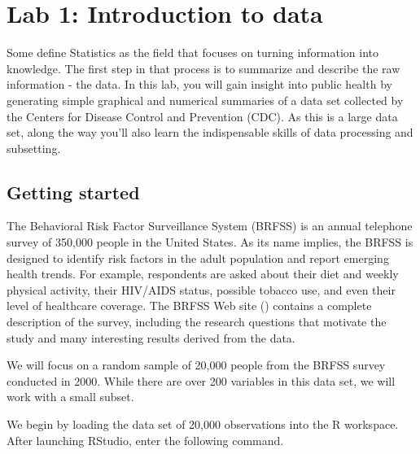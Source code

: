 \documentclass[11pt]{article}
\begin{document}
\let\thefootnote\relax{}

\section*{Lab 1: Introduction to data}
Some define Statistics as the field that focuses on turning information into knowledge.  The first step in that process is to summarize and describe the raw information - the data.  In this lab, you will gain insight into public health by generating simple graphical and numerical summaries of a data set collected by the Centers for Disease Control and Prevention (CDC).  As this is a large data set, along the way you'll also learn the indispensable skills of data processing and subsetting.

\subsection*{Getting started}
The Behavioral Risk Factor Surveillance System (BRFSS) is an annual telephone survey of 350,000 people in the United States. As its name implies, the BRFSS is designed to identify risk factors in the adult population and report emerging health trends. For example, respondents are asked about their diet and weekly physical activity, their HIV/AIDS status, possible tobacco use, and even their level of healthcare coverage. The BRFSS Web site () contains a complete description of the survey, including the research questions that motivate the study and many interesting results derived from the data.

We will focus on a random sample of 20,000 people from the BRFSS survey conducted in 2000. While there are over 200  variables in this data set, we will work with a small subset.

We begin by loading the data set of 20,000 observations into the R workspace. After launching RStudio, enter the following command. 

\ttfamily\noindent
\hlstd{}\hspace*{\fill}\\
\hlkeyword{(}\hlkeyword{)}\hspace*{\fill}\\
\normalfont
\end{document}
